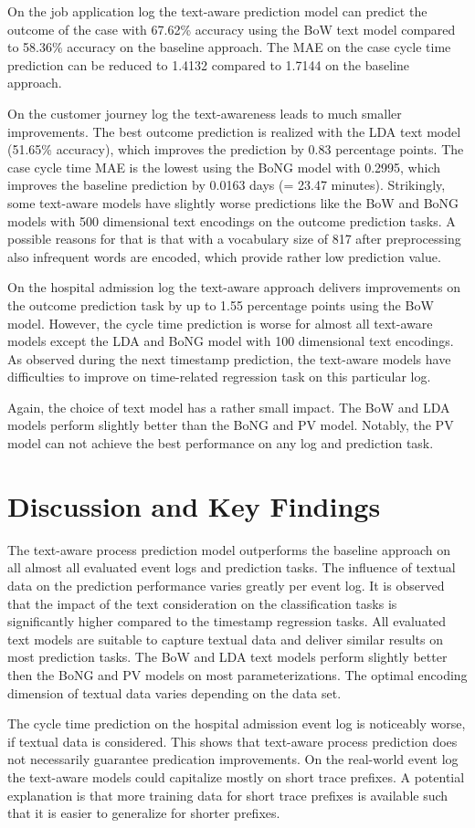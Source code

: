 On the job application log the text-aware prediction model can predict the outcome of the case with 67.62\% accuracy using the BoW text model compared to 58.36\% accuracy on the baseline approach.
The MAE on the case cycle time prediction can be reduced to 1.4132 compared to 1.7144 on the baseline approach.

On the customer journey log the text-awareness leads to much smaller improvements.
The best outcome prediction is realized with the LDA text model (51.65\% accuracy), which improves the prediction by 0.83 percentage points.
The case cycle time MAE is the lowest using the BoNG model with 0.2995, which improves the baseline prediction by 0.0163 days (= 23.47 minutes).
Strikingly, some text-aware models have slightly worse predictions like the BoW and BoNG models with 500 dimensional text encodings on the outcome prediction tasks.
A possible reasons for that is that with a vocabulary size of 817 after preprocessing also infrequent words are encoded, which provide rather low prediction value.

On the hospital admission log the text-aware approach delivers improvements on the outcome prediction task by up to 1.55 percentage points using the BoW model.
However, the cycle time prediction is worse for almost all text-aware models except the LDA and BoNG model with 100 dimensional text encodings.
As observed during the next timestamp prediction, the text-aware models have difficulties to improve on time-related regression task on this particular log.

Again, the choice of text model has a rather small impact.
The BoW and LDA models perform slightly better than the BoNG and PV model.
Notably, the PV model can not achieve the best performance on any log and  prediction task.

\section{Discussion and Key Findings}

The text-aware process prediction model outperforms the baseline approach on all almost all evaluated event logs and prediction tasks.
The influence of textual data on the prediction performance varies greatly per event log.
It is observed that the impact of the text consideration on the classification tasks is significantly higher compared to the timestamp regression tasks.
All evaluated text models are suitable to capture textual data and deliver similar results on most prediction tasks.
The BoW and LDA text models perform slightly better then the BoNG and PV models on most parameterizations.
The optimal encoding dimension of textual data varies depending on the data set.

The cycle time prediction on the hospital admission event log is noticeably worse, if textual data is considered.
This shows that text-aware process prediction does not necessarily guarantee predication improvements.
On the real-world event log the text-aware models could capitalize mostly on short trace prefixes.
A potential explanation is that more training data for short trace prefixes is available such that it is easier to generalize for shorter prefixes.